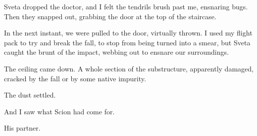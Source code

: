 Sveta dropped the doctor, and I felt the tendrils brush past me, ensnaring bugs.  Then they snapped out, grabbing the door at the top of the staircase.



In the next instant, we were pulled to the door, virtually thrown.  I used my flight pack to try and break the fall, to stop from being turned into a smear, but Sveta caught the brunt of the impact, webbing out to ensnare our surroundings.



The ceiling came down.  A whole section of the substructure, apparently damaged, cracked by the fall or by some native impurity.



The dust settled.



And I saw what Scion had come for.



His partner.





